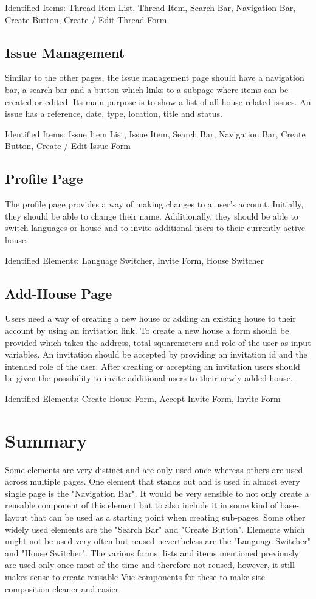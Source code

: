 Identified Items: Thread Item List, Thread Item, Search Bar, Navigation Bar, Create Button, Create / Edit Thread Form

\subsection{Issue Management}
Similar to the other pages, the issue management page should have a navigation bar, a search bar and a button which links to a subpage where items can be created or edited. Its main purpose is to show a list of all house-related issues. An issue has a reference, date, type, location, title and status.

Identified Items: Issue Item List, Issue Item, Search Bar, Navigation Bar, Create Button, Create / Edit Issue Form

\subsection{Profile Page}
The profile page provides a way of making changes to a user's account. Initially, they should be able to change their name. Additionally, they should be able to switch languages or house and to invite additional users to their currently active house. \newline

Identified Elements: Language Switcher, Invite Form, House Switcher

\subsection{Add-House Page}
Users need a way of creating a new house or adding an existing house to their account by using an invitation link. To create a new house a form should be provided which takes the address, total squaremeters and role of the user as input variables. An invitation should be accepted by providing an invitation id and the intended role of the user. After creating or accepting an invitation users should be given the possibility to invite additional users to their newly added house. \newline

Identified Elements: Create House Form, Accept Invite Form, Invite Form

\section{Summary}
Some elements are very distinct and are only used once whereas others are used across multiple pages. One element that stands out and is used in almost every single page is the "Navigation Bar". It would be very sensible to not only create a reusable component of this element but to also include it in some kind of base-layout that can be used as a starting point when creating sub-pages. Some other widely used elements are the "Search Bar" and "Create Button". Elements which might not be used very often but reused nevertheless are the "Language Switcher" and "House Switcher". The various forms, lists and items mentioned previously are used only once most of the time and therefore not reused, however, it still makes sense to create reusable Vue components for these to make site composition cleaner and easier.

